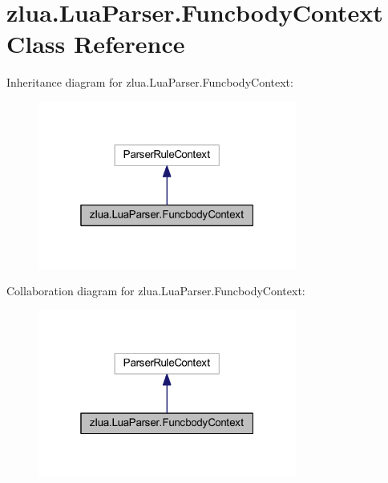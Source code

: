 \hypertarget{classzlua_1_1_lua_parser_1_1_funcbody_context}{}\section{zlua.\+Lua\+Parser.\+Funcbody\+Context Class Reference}
\label{classzlua_1_1_lua_parser_1_1_funcbody_context}


Inheritance diagram for zlua.\+Lua\+Parser.\+Funcbody\+Context\+:
\nopagebreak
\begin{figure}[H]
\begin{center}
\leavevmode
\includegraphics[width=241pt]{classzlua_1_1_lua_parser_1_1_funcbody_context__inherit__graph}
\end{center}
\end{figure}


Collaboration diagram for zlua.\+Lua\+Parser.\+Funcbody\+Context\+:
\nopagebreak
\begin{figure}[H]
\begin{center}
\leavevmode
\includegraphics[width=241pt]{classzlua_1_1_lua_parser_1_1_funcbody_context__coll__graph}
\end{center}
\end{figure}
